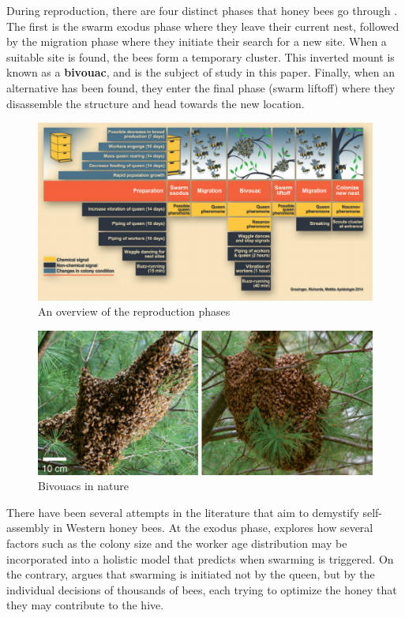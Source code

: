 \documentclass[a4paper,10pt]{article}
\begin{document}
\begin{multicols}{2}
    During reproduction, there are four distinct phases that honey bees go through \cite{grozinger2014molecules}.
    The first is the swarm exodus phase where they leave their current nest, followed by the migration
    phase where they initiate their search for a new site. When a suitable site is found, the
    bees form a temporary cluster. This inverted mount is known as a \textbf{bivouac}, and is
    the subject of study in this paper. Finally, when an alternative has been found, they
    enter the final phase (swarm liftoff) where they disassemble the structure and head towards
    the new location.

    \begin{figure}[H]
        \centering
        \includegraphics[width=\linewidth]{phases.pdf}
        \caption{An overview of the reproduction phases \cite{grozinger2014molecules}}
    \end{figure}


    \begin{figure}[H]
        \centering
        \includegraphics[width=\linewidth]{bivouac_exmaples.pdf}
        \caption{Bivouacs in nature \cite{peleg2018collective}}
    \end{figure}

    There have been several attempts in the literature that aim to demystify self-assembly in Western
    honey bees. At the exodus phase, \cite{fefferman2006modeling} explores how several factors such as
    the colony size and the worker age distribution may be incorporated into a holistic model that predicts
    when swarming is triggered. On the contrary,  \cite{lin2003economics} argues that swarming is initiated
    not by the queen, but by the individual decisions of thousands of bees, each trying to optimize
    the honey that they may contribute to the hive.


\end{multicols}
\end{document}
